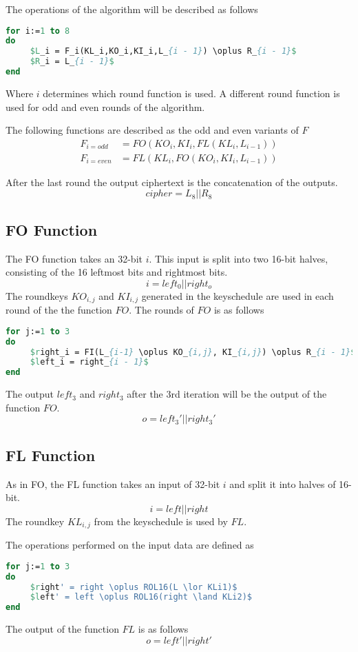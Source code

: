 The operations of the algorithm will be described as follows

\begin{lstlisting}[frame=single, language=Pascal, mathescape,
captionpos=b, caption={Pseudo code for KASUMI alogrithm}]
for i:=1 to 8
do
     $L_i = F_i(KL_i,KO_i,KI_i,L_{i - 1}) \oplus R_{i - 1}$
     $R_i = L_{i - 1}$
end
\end{lstlisting}

Where $i$ determines which round function is used. A different round
function is used for odd and even rounds of the algorithm.

The following functions are described as the odd and even variants of $F$
\begin{align*}
  F_{i = odd} &= FO(KO_i, KI_i, FL(KL_i, L_{i - 1}))\\
  F_{i = even} &= FL(KL_i, FO(KO_i,KI_i, L_{i - 1}))
\end{align*}

After the last round the output ciphertext is the concatenation of the
outputs.
\[cipher = L_8 || R_8\]

\subsection{FO Function}
The FO function takes an 32-bit $i$. This input is split into two
16-bit halves, consisting of the 16 leftmost bits and rightmost bits.
\[i = left_0 || right_o\]
The roundkeys $KO_{i,j}$ and $KI_{i,j}$ generated in the keyschedule
are used in each round of the the function $FO$.
The rounds of $FO$ is as follows
\begin{lstlisting}[frame=single, language=Pascal, mathescape,
captionpos=b, caption={Pseudo code for $FO$ function}]
for j:=1 to 3
do
     $right_i = FI(L_{i-1} \oplus KO_{i,j}, KI_{i,j}) \oplus R_{i - 1}$
     $left_i = right_{i - 1}$
end
\end{lstlisting}
The output $left_3$ and $right_3$ after the $3$rd iteration will be
the output of the function $FO$.
\[o = left_3' || right_3'\]
\subsection{FL Function}
As in FO, the FL function takes an input of 32-bit $i$ and split it into
halves of 16-bit.
\[i = left || right\]
The roundkey $KL_{i,j}$ from the keyschedule is used by $FL$.

The operations performed on the input data are defined as
\begin{lstlisting}[frame=single, language=Pascal, mathescape,
captionpos=b, caption={Pseudo code for $FL$ function}]
for j:=1 to 3
do
     $right' = right \oplus ROL16(L \lor KLi1)$
     $left' = left \oplus ROL16(right \land KLi2)$
end
\end{lstlisting}
The output of the function $FL$ is as follows
\[o = left' || right'\]
